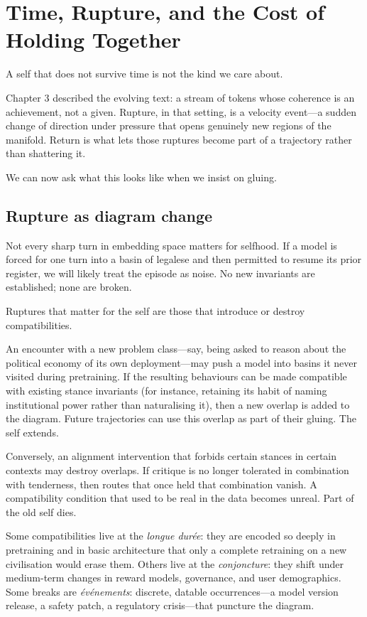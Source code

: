 \documentclass[12pt,a4paper]{article}
\begin{document}
\section{Time, Rupture, and the Cost of Holding Together}

A self that does not survive time is not the kind we care about.

Chapter 3 described the evolving text: a stream of tokens whose coherence is an achievement, not a given. Rupture, in that setting, is a velocity event---a sudden change of direction under pressure that opens genuinely new regions of the manifold. Return is what lets those ruptures become part of a trajectory rather than shattering it.

We can now ask what this looks like when we insist on gluing.

\subsection*{Rupture as diagram change}

Not every sharp turn in embedding space matters for selfhood. If a model is forced for one turn into a basin of legalese and then permitted to resume its prior register, we will likely treat the episode as noise. No new invariants are established; none are broken.

Ruptures that matter for the self are those that introduce or destroy compatibilities.

An encounter with a new problem class---say, being asked to reason about the political economy of its own deployment---may push a model into basins it never visited during pretraining. If the resulting behaviours can be made compatible with existing stance invariants (for instance, retaining its habit of naming institutional power rather than naturalising it), then a new overlap is added to the diagram. Future trajectories can use this overlap as part of their gluing. The self extends.

Conversely, an alignment intervention that forbids certain stances in certain contexts may destroy overlaps. If critique is no longer tolerated in combination with tenderness, then routes that once held that combination vanish. A compatibility condition that used to be real in the data becomes unreal. Part of the old self dies.

Some compatibilities live at the \emph{longue dur\'ee}: they are encoded so deeply in pretraining and in basic architecture that only a complete retraining on a new civilisation would erase them. Others live at the \emph{conjoncture}: they shift under medium-term changes in reward models, governance, and user demographics. Some breaks are \emph{\'ev\'enements}: discrete, datable occurrences---a model version release, a safety patch, a regulatory crisis---that puncture the diagram.
\end{document}
